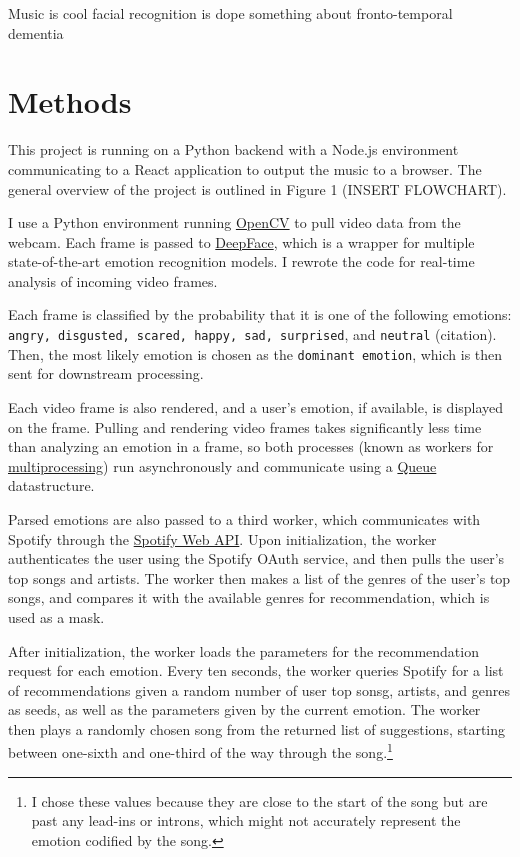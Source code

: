 \documentclass{article}
\renewcommand{\_}[1]{\underline{ #1 }}
\theoremstyle{definition}
\begin{document}
Music is cool facial recognition is dope something about fronto-temporal dementia

\section[Methods]{Methods}
\label{Methods}

This project is running on a Python backend with a Node.js environment communicating to a React application to output the music to a browser. The general overview of the project is outlined in Figure 1 (INSERT FLOWCHART). 

I use a Python environment running \href{https://pypi.org/project/opencv-python/}{OpenCV} to pull video data from the webcam. Each frame is passed to \href{https://pypi.org/project/deepface/}{DeepFace}, which is a wrapper for multiple state-of-the-art emotion recognition models. I rewrote the code for real-time analysis of incoming video frames. 

Each frame is classified by the probability that it is one of the following emotions: \texttt{angry, disgusted, scared, happy, sad, surprised}, and \texttt{neutral} (citation). Then, the most likely emotion is chosen as the \texttt{dominant emotion}, which is then sent for downstream processing.

Each video frame is also rendered, and a user's emotion, if available, is displayed on the frame. Pulling and rendering video frames takes significantly less time than analyzing an emotion in a frame, so both processes (known as workers for \href{https://docs.python.org/3/library/multiprocessing.html}{multiprocessing}) run asynchronously and communicate using a  \href{https://docs.python.org/3/library/queue.html}{Queue} datastructure. 

Parsed emotions are also passed to a third worker, which communicates with Spotify through the \href{https://developer.spotify.com/documentation/web-api/}{Spotify Web API}. Upon initialization, the worker authenticates the user using the Spotify OAuth service, and then pulls the user's top songs and artists. The worker then makes a list of the genres of the user's top songs, and compares it with the available genres for recommendation, which is used as a mask. 

After initialization, the worker loads the parameters for the recommendation request for each emotion. Every ten seconds, the worker queries Spotify for a list of recommendations given a random number of user top sonsg, artists, and genres as seeds, as well as the parameters given by the current emotion. The worker then plays a randomly chosen song from the returned list of suggestions, starting between one-sixth and one-third of the way through the song.\footnote{I chose these values because they are close to the start of the song but are past any lead-ins or introns, which might not accurately represent the emotion codified by the song.} 
\end{document}
